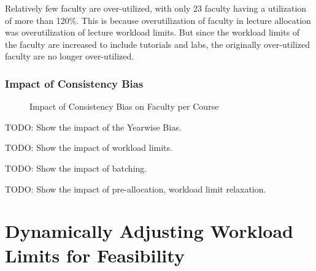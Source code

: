 Relatively few faculty are over-utilized, with only 23 faculty having a utilization of more than 120\%. This is because overutilization of faculty in lecture allocation was overutilization of lecture workload limits. But since the workload limits of the faculty are increased to include tutorials and labs, the originally over-utilized faculty are no longer over-utilized.

\subsubsection{Impact of Consistency Bias}

\begin{figure}[H]
  \centering

  \caption{Impact of Consistency Bias on Faculty per Course}
  \label{fig:tut_consistency_bias}
\end{figure}

TODO: Show the impact of the Yearwise Bias.

TODO: Show the impact of workload limits.

TODO: Show the impact of batching.

TODO: Show the impact of pre-allocation, workload limit relaxation.


\section{Dynamically Adjusting Workload Limits for Feasibility}

